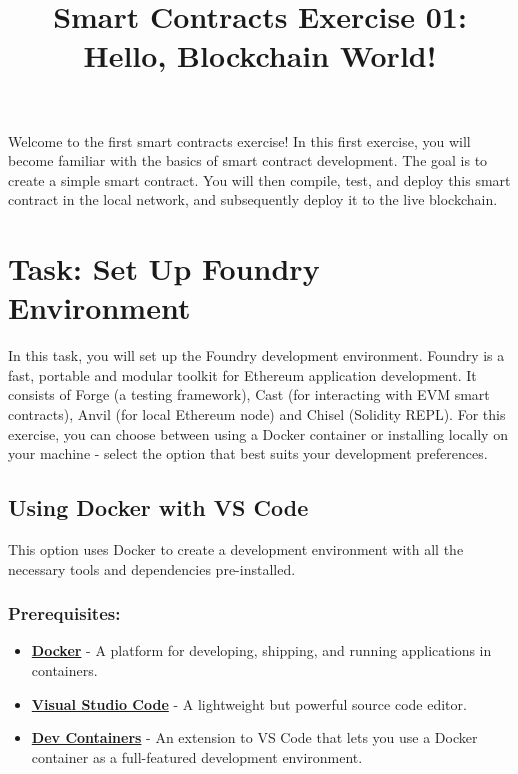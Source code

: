\documentclass[12pt]{article}
\title{Smart Contracts Exercise 01: \\ Hello, Blockchain World!}
\author{}
\date{}
\begin{document}
\maketitle
\noindent
Welcome to the first smart contracts exercise! In this first exercise, you will become familiar with the basics of smart contract development. The goal is to create a simple smart contract. You will then compile, test, and deploy this smart contract in the local network, and subsequently deploy it to the live blockchain.

\section{Task: Set Up Foundry Environment}

In this task, you will set up the Foundry development environment. Foundry is a fast, portable and modular toolkit for Ethereum application development. It consists of Forge (a testing framework), Cast (for interacting with EVM smart contracts), Anvil (for local Ethereum node) and Chisel (Solidity REPL). For this exercise, you can choose between using a Docker container or installing locally on your machine - select the option that best suits your development preferences.

\subsection{Using Docker with VS Code}

This option uses Docker to create a development environment with all the necessary tools and dependencies pre-installed.

\subsubsection*{Prerequisites:}

\begin{itemize}
    \item \textbf{\href{https://www.docker.com/products/docker-desktop}{Docker}} - A platform for developing, shipping, and running applications in containers.
    \item \textbf{\href{https://code.visualstudio.com/}{Visual Studio Code}} - A lightweight but powerful source code editor.
    \item \textbf{\href{https://marketplace.visualstudio.com/items?itemName=ms-vscode-remote.remote-containers}{Dev Containers}} - An extension to VS Code that lets you use a Docker container as a full-featured development environment.
\end{itemize}
\end{document}
